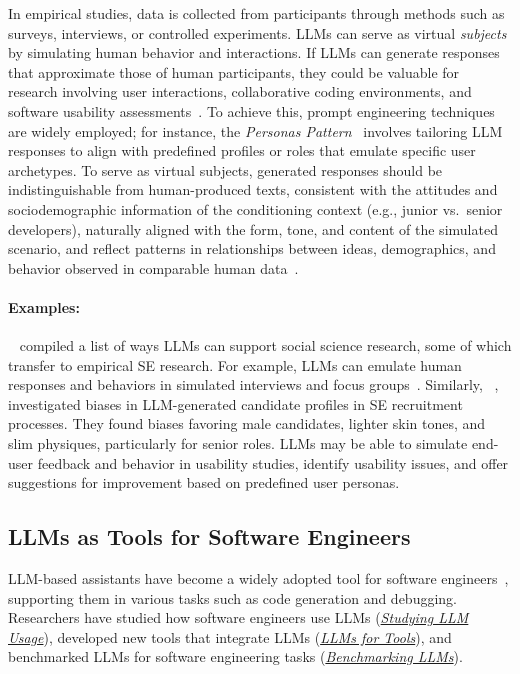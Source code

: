 \documentclass[smallextended]{svjour3}
\newcommand{\llmusage}{\hyperref[sec:studying-llm-usage-in-software-engineering]{\emph{Studying LLM Usage}}\xspace}
\newcommand{\newtools}{\hyperref[sec:llms-for-new-software-engineering-tools]{\emph{LLMs for Tools}}\xspace}
\newcommand{\benchmarkingtasks}{\hyperref[sec:benchmarking-llms-for-software-engineering-tasks]{\emph{Benchmarking LLMs}}\xspace}
\newcommand{\llmusage}{\href{/study-types\#studying-llm-usage-in-software-engineering}{\emph{Studying LLM Usage}}\xspace}
\newcommand{\newtools}{\href{/study-types\#llms-for-new-software-engineering-tools}{\emph{LLMs for Tools}}\xspace}
\newcommand{\benchmarkingtasks}{\href{/study-types\#benchmarking-llms-for-software-engineering-tasks}{\emph{Benchmarking LLMs}}\xspace}
\newcommand{\studytypeparagraph}[1]{\paragraph{\bfseries #1:}}
\newcommand{\studytypeparagraph}[1]{\subsubsection{#1}}
\begin{document}
In empirical studies, data is collected from participants through methods such as surveys, interviews, or controlled experiments.
LLMs can serve as virtual \emph{subjects} by simulating human behavior and interactions. If LLMs can generate responses that approximate those of human participants, they could be valuable for research involving user interactions, collaborative coding environments, and software usability assessments~\cite{ZHAO2025101167}.
To achieve this, prompt engineering techniques are widely employed; for instance, the \textit{Personas Pattern}~\cite{DBLP:conf/naacl/KongZCLQSZWD24} involves tailoring LLM responses to align with predefined profiles or roles that emulate specific user archetypes.
To serve as virtual subjects, generated responses should be indistinguishable from human-produced texts, consistent with the attitudes and sociodemographic information of the conditioning context (e.g., junior vs.\ senior developers), naturally aligned with the form, tone, and content of the simulated scenario, and reflect patterns in relationships between ideas, demographics, and behavior observed in comparable human data~\cite{DBLP:journals/corr/abs-2209-06899}.

\studytypeparagraph{Examples}

\citeauthor{DBLP:journals/ipm/XuSRGPLSH24}~\cite{DBLP:journals/ipm/XuSRGPLSH24} compiled a list of ways LLMs can support social science research, some of which transfer to empirical SE research. For example, LLMs can emulate human responses and behaviors in simulated interviews and focus groups~\cite{DBLP:journals/ase/GerosaTSS24}. Similarly, \citeauthor{DBLP:conf/icse/BanoGH25}~\cite{DBLP:conf/icse/BanoGH25}, investigated biases in LLM-generated candidate profiles in SE recruitment processes. They found biases favoring male candidates, lighter skin tones, and slim physiques, particularly for senior roles. LLMs may be able to simulate end-user feedback and behavior in usability studies, identify usability issues, and offer suggestions for improvement based on predefined user personas.
 
\subsection{LLMs as Tools for Software Engineers}
\label{sec:llms-as-tools-for-software-engineers}

LLM-based assistants have become a widely adopted tool for software engineers~\cite{stackoverflow2025survey}, supporting them in various tasks such as code generation and debugging.
Researchers have studied how software engineers use LLMs (\llmusage), developed new tools that integrate LLMs (\newtools), and benchmarked LLMs for software engineering tasks (\benchmarkingtasks).
 
\end{document}
